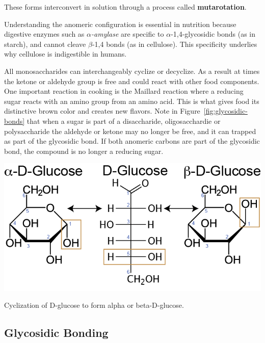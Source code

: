 \documentclass{tufte-handout}
\begin{document}
These forms interconvert in solution through a process called \textbf{mutarotation}.

Understanding the anomeric configuration is essential in nutrition because digestive enzymes such as \textit{$\alpha$-amylase} are specific to $\alpha$-1,4-glycosidic bonds (as in starch), and cannot cleave $\beta$-1,4 bonds (as in cellulose). This specificity underlies why cellulose is indigestible in humans.


  All monosaccharides can interchangeably cyclize or decyclize.  As a result at times the ketone or aldehyde group is free and could react with other food components.  One important reaction in cooking is the Maillard reaction where a reducing sugar reacts with an amino group from an amino acid.  This is what gives food its distinctive brown color and creates new flavors.  Note in Figure~\ref{fig:glycosidic-bonds} that when a sugar is part of a disaccharide, oligosacchardie or polysaccharide the aldehyde or ketone may no longer be free, and it can trapped as part of the glycosidic bond.  If both anomeric carbons are part of the glycosidic bond, the compound is no longer a reducing sugar.


\begin{marginfigure}
\includegraphics{figures/Glucose-ab.png}
\caption{Cyclization of D-glucose to form alpha or beta-D-glucose.}\label{fig:sugar-ab}
\end{marginfigure}


\subsection{Glycosidic Bonding}
\end{document}
